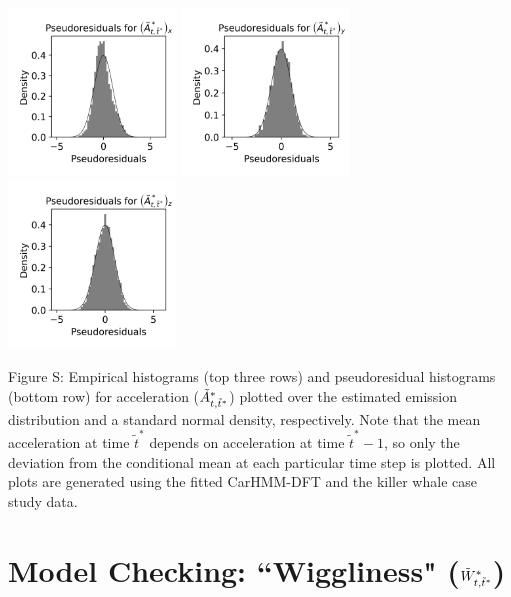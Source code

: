 \documentclass{article}
\begin{document}
\begin{center}
        \includegraphics[width=1.75in]{../Plots/2019/20190902-182840-CATs_OB_1_0_267_CarHMM_pseudresids_Ax.png}
        \includegraphics[width=1.75in]{../Plots/2019/20190902-182840-CATs_OB_1_0_267_CarHMM_pseudresids_Ay.png}
        \includegraphics[width=1.75in]{../Plots/2019/20190902-182840-CATs_OB_1_0_267_CarHMM_pseudresids_Az.png}
        \end{center}
        
        \noindent Figure S: Empirical histograms (top three rows) and pseudoresidual histograms (bottom row) for acceleration ($\tilde{A}^*_{t,\tilde t^*}$) plotted over the estimated emission distribution and a standard normal density, respectively. Note that the mean acceleration at time $\tilde t^*$ depends on acceleration at time $\tilde t^*-1$, so only the deviation from the conditional mean at each particular time step is plotted. All plots are generated using the fitted CarHMM-DFT and the killer whale case study data.
        \addtocounter{fignum}{1}
        
    \section{Model Checking: ``Wiggliness" ($\tilde{W}^*_{t,\tilde t^*}$)}
        
\end{document}
